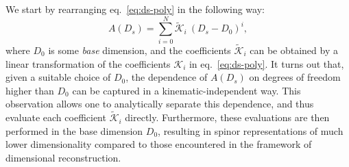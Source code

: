 We start by rearranging eq.~\eqref{eq:ds-poly} in the following way:
\begin{equation}
  A(D_s) = \sum_{i=0}^{N} \tilde{\mathcal{K}}_i~(D_s-D_0)^{i},
  \label{eq:ds-poly-alt}
\end{equation}
where $D_0$ is some \textit{base} dimension, and the coefficients $\tilde{\mathcal{K}}_i$
can be obtained by a linear transformation of the coefficients $\mathcal{K}_i$ in eq.~\eqref{eq:ds-poly}.
It turns out that, given a suitable choice of $D_0$,
the dependence of $A(D_s)$ on degrees of freedom higher than $D_0$ can
be captured in a kinematic-independent way.  
This observation allows one to analytically separate this
dependence, and thus evaluate each coefficient $\tilde{\mathcal{K}}_i$
directly. Furthermore, these evaluations are then performed in the base
dimension $D_0$, resulting in spinor representations of much lower dimensionality
compared to those encountered in the framework of dimensional reconstruction.

